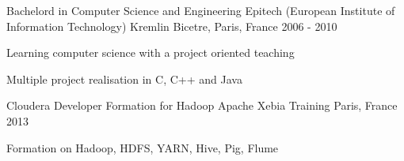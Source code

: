 

\begin{cventries}

  \cventry
    {Bachelord in Computer Science and Engineering} %
    {Epitech (European Institute of Information Technology)} %
    {Kremlin Bicetre, Paris, France} %
    {2006 - 2010} %
    {
      \begin{cvitems} %
        \item {Learning computer science with a project oriented teaching}
        \item {Multiple project realisation in C, C++ and Java}
      \end{cvitems}
    }
  \cventry
    {Cloudera Developer Formation for Hadoop Apache} %
    {Xebia Training}
    {Paris, France} %
    {2013} %
    {
      \begin{cvitems} %
        \item {Formation on Hadoop, HDFS, YARN, Hive, Pig, Flume}
      \end{cvitems}
    }

\end{cventries}
